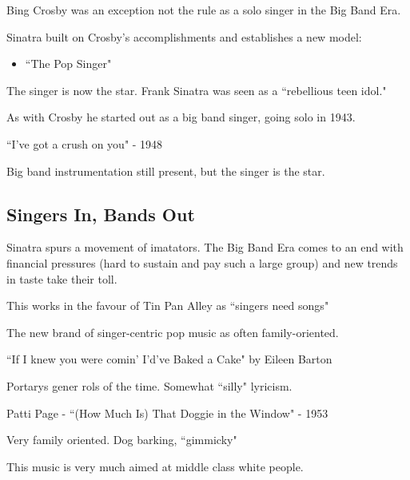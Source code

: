 \documentclass[12pt, a4paper, twoside, openright, titlepage]{book}
\begin{document}
\begin{note}{}{}
    Bing Crosby was an exception not the rule as a solo singer in the Big Band Era.
\end{note}

Sinatra built on Crosby's accomplishments and establishes a new model: \begin{itemize}
    \item ``The Pop Singer"
\end{itemize}

The singer is now the star. Frank Sinatra was seen as a ``rebellious teen idol."

As with Crosby he started out as a big band singer, going solo in 1943.

\begin{eg}{}{}
    ``I've got a crush on you" - 1948


    Big band instrumentation still present, but the singer is the star.
\end{eg}

\subsection{Singers In, Bands Out}


Sinatra spurs a movement of imatators. The Big Band Era comes to an end with financial pressures (hard to sustain and pay such a large group) and new trends in taste take their toll.

This works in the favour of Tin Pan Alley as ``singers need songs"

\begin{rmk}{}{}
    The new brand of singer-centric pop music as often family-oriented.
\end{rmk}

\begin{eg}{}{}
    ``If I knew you were comin' I'd've Baked a Cake" by Eileen Barton

    Portarys gener rols of the time. Somewhat ``silly" lyricism.
\end{eg}

\begin{eg}{}{}
    Patti Page - ``(How Much Is) That Doggie in the Window" - 1953

    Very family oriented. Dog barking, ``gimmicky"
\end{eg}

\begin{note}{}{}
    This music is very much aimed at middle class white people.
\end{note}
\end{document}

